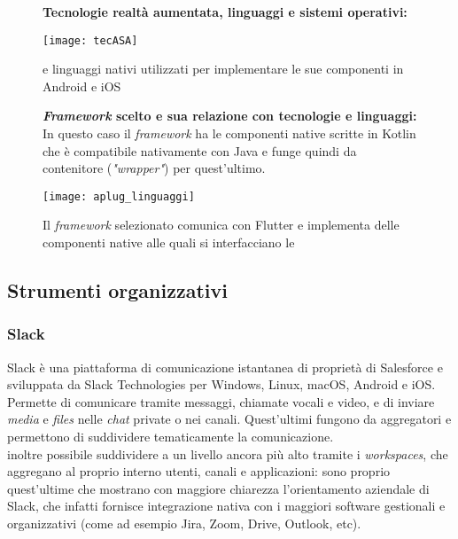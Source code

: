 \begin{figure}[H]
    \textbf{Tecnologie realtà aumentata, linguaggi e sistemi operativi:}
    \begin{center}
    \texttt{[image: tecASA]}
    \caption{\asa{} e linguaggi nativi utilizzati per implementare le sue componenti in Android e iOS}
    \end{center}
\end{figure}

\begin{figure}[H]
    \textbf{\textit{Framework} scelto e sua relazione con tecnologie e linguaggi:}\\
    In questo caso il \textit{framework} ha le componenti native scritte in Kotlin che è compatibile nativamente con Java e funge quindi da contenitore (\textit{"wrapper"}) per quest'ultimo.\\
    \begin{center}
    \texttt{[image: aplug\_linguaggi]}
    \caption{Il \textit{framework} selezionato comunica con Flutter e implementa delle componenti native alle quali si interfacciano le \asa{}}
    \end{center}
\end{figure}
\subsection{Strumenti organizzativi}
\subsubsection{Slack}
Slack è una piattaforma di comunicazione istantanea di proprietà di Salesforce e sviluppata da Slack Technologies per Windows, Linux, macOS, Android e iOS.\\
Permette di comunicare tramite messaggi, chiamate vocali e video, e di inviare \textit{media} e \textit{files} nelle \textit{chat} private o nei canali. Quest'ultimi fungono da aggregatori e permettono di suddividere tematicamente la comunicazione.\\
\e{} inoltre possibile suddividere a un livello ancora più alto tramite i \textit{workspaces}, che aggregano al proprio interno utenti, canali e applicazioni: sono proprio quest'ultime che mostrano con maggiore chiarezza l'orientamento aziendale di Slack, che infatti fornisce integrazione nativa con i maggiori software gestionali e organizzativi (come ad esempio Jira, Zoom, Drive, Outlook, etc).

